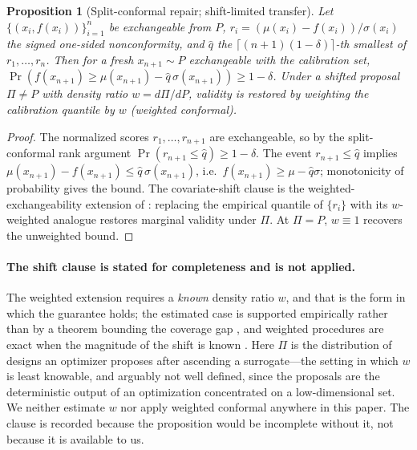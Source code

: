 \documentclass[letterpaper]{article}
\theoremstyle{plain}
\newtheorem{proposition}{Proposition}
\begin{document}
\begin{proposition}[Split-conformal repair; shift-limited transfer]
Let $\{(x_i,f(x_i))\}_{i=1}^n$ be exchangeable from $P$, $r_i=(\mu(x_i)-f(x_i))/\sigma(x_i)$ the signed one-sided nonconformity, and $\hat q$ the $\lceil(n{+}1)(1{-}\delta)\rceil$-th smallest of $r_1,\dots,r_n$. Then for a fresh $x_{n+1}\sim P$ exchangeable with the calibration set,
$\Pr(f(x_{n+1})\ge\mu(x_{n+1})-\hat q\,\sigma(x_{n+1}))\ge 1{-}\delta$.
Under a shifted proposal $\Pi\neq P$ with density ratio $w=d\Pi/dP$, validity is restored by weighting the calibration quantile by $w$ (weighted conformal).
\end{proposition}
\begin{proof}
The normalized scores $r_1,\dots,r_{n+1}$ are exchangeable, so by the split-conformal rank argument $\Pr(r_{n+1}\le\hat q)\ge1{-}\delta$. The event $r_{n+1}\le\hat q$ implies $\mu(x_{n+1})-f(x_{n+1})\le\hat q\,\sigma(x_{n+1})$, i.e.\ $f(x_{n+1})\ge\mu-\hat q\sigma$; monotonicity of probability gives the bound. The covariate-shift clause is the weighted-exchangeability extension of \citet{tibshirani2019conformal}: replacing the empirical quantile of $\{r_i\}$ with its $w$-weighted analogue restores marginal validity under $\Pi$. At $\Pi=P$, $w\equiv1$ recovers the unweighted bound.
\end{proof}

\paragraph{The shift clause is stated for completeness and is not applied.} The weighted extension requires a \emph{known} density ratio $w$, and that is the form in which the guarantee holds; the estimated case is supported empirically rather than by a theorem bounding the coverage gap \citep{tibshirani2019conformal}, and weighted procedures are exact when the magnitude of the shift is known \citep{angelopoulos2023conformal}. Here $\Pi$ is the distribution of designs an optimizer proposes after ascending a surrogate---the setting in which $w$ is least knowable, and arguably not well defined, since the proposals are the deterministic output of an optimization concentrated on a low-dimensional set. We neither estimate $w$ nor apply weighted conformal anywhere in this paper. The clause is recorded because the proposition would be incomplete without it, not because it is available to us.
\end{document}
